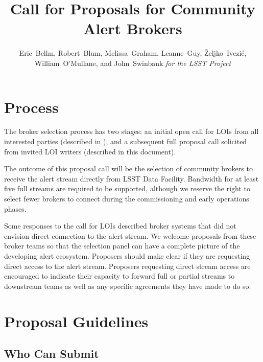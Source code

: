 \documentclass[DM,toc,lsstdraft]{lsstdoc}
\title{Call for Proposals for Community Alert Brokers}
\author{
Eric~Bellm,
Robert~Blum,
Melissa~Graham,
Leanne~Guy,
\v{Z}eljko~Ivezi\'{c},
William~O'Mullane,
and John~Swinbank
\emph{for the LSST Project}
}
\begin{document}

\maketitle

\section{Process}

The broker selection process has two stages:
an initial open call for LOIs from all interested parties (described in ), and a subsequent full proposal call solicited from invited LOI writers (described in this document).

The outcome of this proposal call will be the selection of community brokers to receive the alert stream directly from LSST Data Facility.
Bandwidth for at least five full streams are required to be supported, although we reserve the right to select fewer brokers to connect during the commissioning and early operations phases.

Some responses to the call for LOIs described broker systems that did not envision direct connection to the alert stream.
We welcome proposals from these broker teams so that the selection panel can have a complete picture of the developing alert ecosystem.
Proposers should make clear if they are requesting direct access to the alert stream.
Proposers requesting direct stream access are encouraged to indicate their capacity to forward full or partial streams to downstream teams as well as any specific agreements they have made to do so. 


\section{Proposal Guidelines}

\subsection{Who Can Submit}
\end{document}
